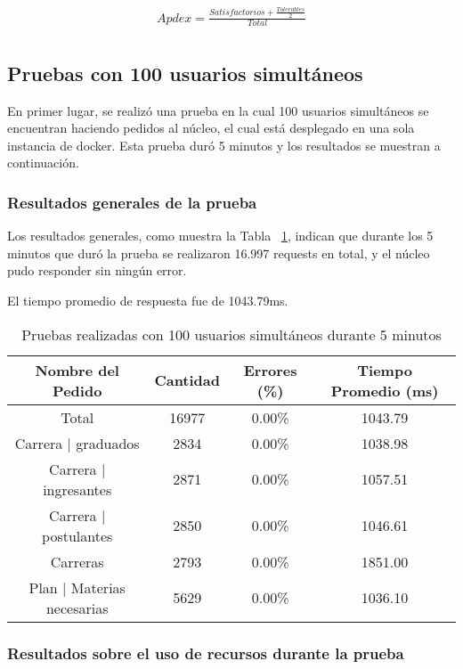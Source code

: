 \begin{align*}
  Apdex = \frac{Satisfactorios + \frac{Tolerables}{2}}{Total}\\
\end{align*}

\subsection{Pruebas con 100 usuarios simultáneos}
En primer lugar, se realizó una prueba en la cual 100 usuarios simultáneos se encuentran haciendo pedidos al núcleo, el cual está desplegado en una sola instancia de docker.
Esta prueba duró 5 minutos y los resultados se muestran a continuación.


\subsubsection{Resultados generales de la prueba}


Los resultados generales, como muestra la Tabla ~\ref{tab:100u_5m_gen}, indican que durante los 5 minutos que duró la prueba se realizaron 16.997 requests en total, y el núcleo pudo responder sin ningún error.

El tiempo promedio de respuesta fue de 1043.79ms.

\begin{table}[!htbp]
    \centering
    \makegapedcells
    \begin{tabular}{|c|c|c|c|}
    \hline
    Nombre del Pedido & Cantidad & Errores (\%) & Tiempo Promedio (ms) \\ \hline
    Total & 16977 & 0.00\% & 1043.79\\ \hline
    Carrera | graduados & 2834 & 0.00\% & 1038.98\\ \hline
    Carrera | ingresantes & 2871 & 0.00\% & 1057.51\\ \hline
    Carrera | postulantes & 2850 & 0.00\% & 1046.61\\ \hline
    Carreras & 2793 & 0.00\% & 1851.00\\ \hline
    Plan | Materias necesarias & 5629 & 0.00\% & 1036.10\\ \hline
    
    \end{tabular}
    \caption{Pruebas realizadas con 100 usuarios simultáneos durante 5 minutos}
    \label{tab:100u_5m_gen}
\end{table}


\subsubsection{Resultados sobre el uso de recursos durante la prueba}

